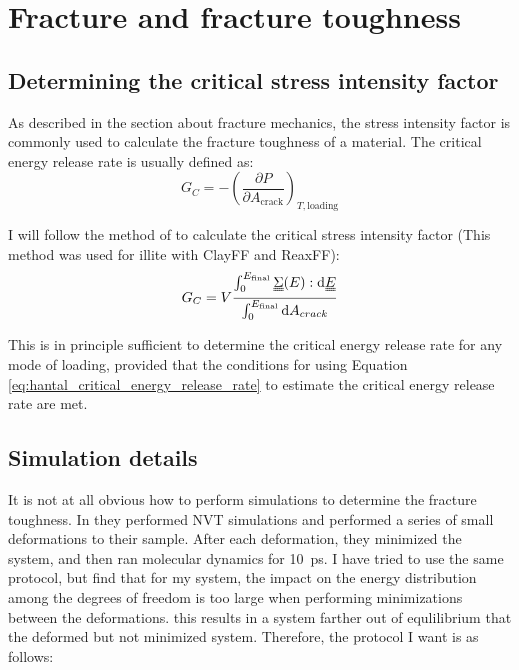 \section{Fracture and fracture toughness}

\subsection{Determining the critical stress intensity factor}
As described in the section about fracture mechanics, the stress intensity factor is commonly used to calculate the fracture toughness of a material. The critical energy release rate is usually defined as:
\begin{equation}
	G_C = -\left(\frac{\partial P}{\partial A_{\text{crack}}}\right)_{T, \text{loading}}
	\label{eq:def_critical_energy_release_rate}
\end{equation}

I will follow the method of \cite{Hantal2014} to calculate the critical stress intensity factor (This method was used for illite with ClayFF and ReaxFF):\begin{equation}
	G_C = V \frac{\int_0^{E_{\text{final}}}\uuline{\Sigma}(E) : \dd \uuline{E}}{\int_0^{E_{\text{final}}} \dd A_{crack}}
	\label{eq:hantal_critical_energy_release_rate}
\end{equation}

This is in principle sufficient to determine the critical energy release rate for any mode of loading, provided that the conditions for using Equation \ref{eq:hantal_critical_energy_release_rate} to estimate the critical energy release rate are met.

\subsection{Simulation details}
It is not at all obvious how to perform simulations to determine the fracture toughness. In \cite{Hantal2014} they performed NVT simulations and performed a series of small deformations to their sample. After each deformation, they minimized the system, and then ran molecular dynamics for \SI{10}{\pico\second}. I have tried to use the same protocol, but find that for my system, the impact on the energy distribution among the degrees of freedom is too large when performing minimizations between the deformations. this results in a system farther out of equlilibrium that the deformed but not minimized system. Therefore, the protocol I want is as follows:

